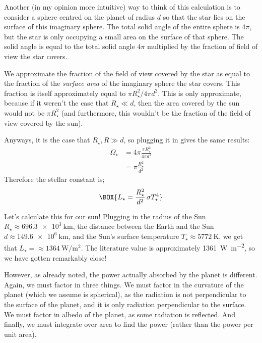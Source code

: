 Another (in my opinion more intuitive) way to think of this calculation is to consider a sphere centred on the planet of radius $d$ so that the star lies on the surface of this imaginary sphere. The total solid angle of the entire sphere is $4\pi$, but the star is only occupying a small area on the surface of that sphere. The solid angle is equal to the total solid angle $4\pi$ multiplied by the fraction of field of view the star covers.

We approximate the fraction of the field of view covered by the star as equal to the fraction of the \textit{surface area} of the imaginary sphere the star covers. This fraction is itself approximately equal to $\pi R_{\star}^2/4\pi d^2$. This is only approximate, because if it weren't the case that $R_\star\ll d$, then the area covered by the sun would not be $\pi R_{\star}^2$ (and furthermore, this wouldn't be the fraction of the field of view covered by the sun).

Anyways, it is the case that $R_{\star},R\gg d$, so plugging it in gives the same results:
\begin{align*}
    \Omega_{\star}&=4\pi\frac{\pi R_{\star}^2}{4\pi d^2}\\
    &=\pi \frac{R_{\star}^2}{d^2}
\end{align*}
Therefore the stellar constant is;
\begin{align}
    \BOX{
    L_{\star}=\frac{R_{\star}^2}{d^2}\,\sigma T_{\star}^4}
\end{align}

Let's calculate this for our sun! Plugging in the radius of the Sun $R_\star\approx\qty{696.3e3}{\kilo\metre}$, the distance between the Earth and the Sun $d\approx\qty{149.6e6}{\kilo\metre}$, and the Sun's surface temperature $T_\star\approx\qty{5772}{\kelvin}$, we get that $L_\star=\approx\qty{1364}{\watt\per\square\meter}$. The literature value is approximately \qty{1361}{\watt\per\square\meter}, so we have gotten remarkably close!

However, as already noted, the power actually absorbed by the planet is different. Again, we must factor in three things. We must factor in the curvature of the planet (which we assume is spherical), as the radiation is not perpendicular to the surface of the planet, and it is only radiation perpendicular to the surface. We must factor in albedo of the planet, as some radiation is reflected. And finally, we must integrate over area to find the power (rather than the power per unit area).

